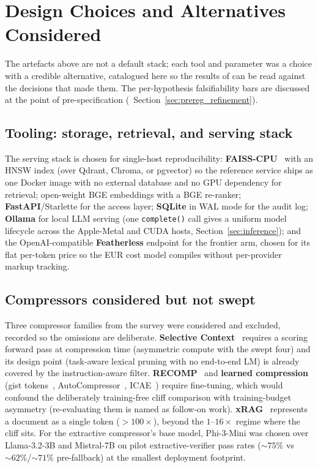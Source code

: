\section{Design Choices and Alternatives Considered}
\label{sec:design_choices}

The artefacts above are not a default stack; each tool and parameter
was a choice with a credible alternative, catalogued here so the
results of  can be read against the decisions
that made them. The per-hypothesis falsifiability bars are discussed
at the point of pre-specification
(~Section~\ref{sec:prereg_refinement}).



\subsection{Tooling: storage, retrieval, and serving stack}
\label{sec:design_tooling}
The serving stack is chosen for single-host reproducibility:
\textbf{FAISS-CPU}~\cite{faiss} with an HNSW index (over Qdrant, Chroma,
or pgvector) so the reference service ships as one Docker image with no
external database and no GPU dependency for retrieval; open-weight BGE
embeddings with a BGE re-ranker; \textbf{FastAPI}/Starlette for the
access layer; \textbf{SQLite} in WAL mode for the audit log; \textbf{Ollama} for local LLM serving (one
\texttt{complete()} call gives a uniform model lifecycle across the
Apple-Metal and CUDA hosts, Section~\ref{sec:inference}); and the
OpenAI-compatible \textbf{Featherless} endpoint for the frontier arm,
chosen for its flat per-token price so the EUR cost model compiles
without per-provider markup tracking.

\subsection{Compressors considered but not swept}
\label{sec:design_compressors_declined}

Three compressor families from the survey were considered and
excluded, recorded so the omissions are deliberate.
\textbf{Selective Context}~\cite{li2023selective} requires a scoring
forward pass at compression time (asymmetric compute with the swept
four) and its design point (task-aware lexical pruning with no
end-to-end LM) is already covered by the instruction-aware filter.
\textbf{RECOMP}~\cite{xu2024recomp} and \textbf{learned compression}
(gist tokens~\cite{mu2023gist},
AutoCompressor~\cite{chevalier2023autocompressor},
ICAE~\cite{ge2024icae}) require fine-tuning, which would confound the
deliberately training-free cliff comparison with training-budget
asymmetry (re-evaluating them is named as follow-on work).
\textbf{xRAG}~\cite{cheng2024xrag} represents a document as a single
token ($>100\times$), beyond the $1$--$16\times$ regime where the
cliff sits. For the extractive compressor's base model, Phi-3-Mini
was chosen over Llama-3.2-3B and Mistral-7B on pilot
extractive-verifier pass rates ($\sim 75\%$ vs
$\sim 62\%$/$\sim 71\%$ pre-fallback) at the smallest deployment
footprint.

